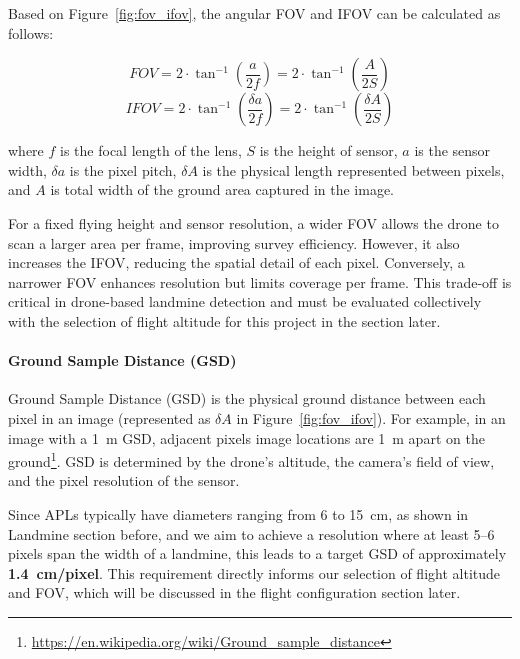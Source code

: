 Based on Figure~\ref{fig:fov_ifov}, the angular FOV and IFOV can be calculated as follows:

\begin{equation}
    FOV = 2 \cdot \tan^{-1} \left( \frac{a}{2f} \right) = 2 \cdot \tan^{-1} \left( \frac{A}{2S} \right)
    \label{eq:fov}
\end{equation}
\vspace{-1em}
\begin{equation}
    IFOV = 2 \cdot \tan^{-1} \left( \frac{\delta a}{2f} \right) = 2 \cdot \tan^{-1} \left( \frac{\delta A}{2S} \right)
\end{equation}

where \( f \) is the focal length of the lens, \( S \) is the height of sensor, \( a \) is the sensor width, \( \delta a \) is the pixel pitch, \( \delta A \) is the physical length represented between pixels, and \( A \) is total width of the ground area captured in the image.

For a fixed flying height and sensor resolution, a wider FOV allows the drone to scan a larger area per frame, improving survey efficiency. However, it also increases the IFOV, reducing the spatial detail of each pixel. Conversely, a narrower FOV enhances resolution but limits coverage per frame. This trade-off is critical in drone-based landmine detection and must be evaluated collectively with the selection of flight altitude for this project in the section later.


\paragraph{Ground Sample Distance (GSD)}

Ground Sample Distance (GSD) is the physical ground distance between each pixel in an image (represented as \( \delta A \) in Figure~\ref{fig:fov_ifov}). For example, in an image with a 1~m GSD, adjacent pixels image locations are 1~m apart on the ground\footnote{\url{https://en.wikipedia.org/wiki/Ground_sample_distance}}. GSD is determined by the drone’s altitude, the camera’s field of view, and the pixel resolution of the sensor.

Since APLs typically have diameters ranging from 6 to 15~cm, as shown in Landmine section before, and we aim to achieve a resolution where at least 5–6 pixels span the width of a landmine, this leads to a target GSD of approximately \textbf{1.4~cm/pixel}. This requirement directly informs our selection of flight altitude and FOV, which will be discussed in the flight configuration section later.


